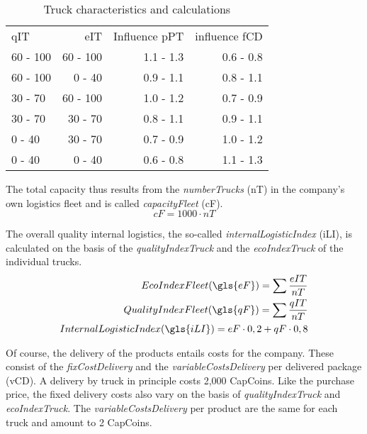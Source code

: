 \begin{table}[ht]
    \centering
    \begin{tabular}{|l|r|r|r|}
    \hline
    qIT & eIT & Influence pPT & influence fCD \\
    60 - 100      & 60 - 100   & 1.1 - 1.3   & 0.6 - 0.8       \\
    60 - 100      & 0 - 40     & 0.9 - 1.1   & 0.8 - 1.1       \\
    30 - 70       & 60 - 100   & 1.0 - 1.2   & 0.7 - 0.9       \\
    30 - 70       & 30 - 70    & 0.8 - 1.1   & 0.9 - 1.1       \\
    0 - 40        & 30 - 70    & 0.7 - 0.9   & 1.0 - 1.2       \\
    0 - 40        & 0 - 40     & 0.6 - 0.8   & 1.1 - 1.3       \\
    \hline
    \end{tabular}
    \caption{Truck characteristics and calculations}
    \label{Truck_characteristics}
\end{table}

The total capacity thus results from the \textit{numberTrucks} (\gls{nT}) in the company's own logistics fleet and is called \textit{capacityFleet} (\gls{cF}). 
\begin{equation}
\label{func:capacityFleet}
    cF = 1000 \cdot nT
\end{equation}

The overall quality internal logistics, the so-called \textit{internalLogisticIndex} (\gls{iLI}), is calculated on the basis of the \textit{qualityIndexTruck} and the \textit{ecoIndexTruck} of the individual trucks.
\begin{equation}
\label{func:internalLogisticIndex}
\begin{aligned}
    Eco Index Fleet (\gls{eF}) = \sum \frac{eIT}{nT} \\
    Quality Index Fleet (\gls{qF}) = \sum \frac{qIT}{nT}\\
    Internal Logistic Index (\gls{iLI}) = eF \cdot 0,2 + qF \cdot 0,8 \\
\end{aligned}
\end{equation}

Of course, the delivery of the products entails costs for the company. These consist of the \textit{fixCostDelivery} and the \textit{variableCostsDelivery} per delivered package (\gls{vCD}). 
A delivery by truck in principle costs 2,000 CapCoins. Like the purchase price, the fixed delivery costs also vary on the basis of \textit{qualityIndexTruck} and \textit{ecoIndexTruck}. The \textit{variableCostsDelivery} per product are the same for each truck and amount to 2 CapCoins.

